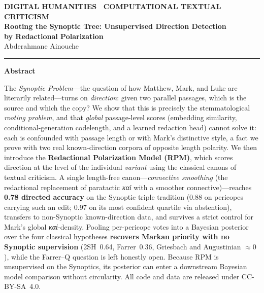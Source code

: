 \documentclass[11pt,letterpaper]{article}
\newcommand{\gk}[1]{{\greekfont\itshape #1}}
\begin{document}
\thispagestyle{firstpage}
\begin{flushleft}
{\headfont\footnotesize\bfseries\color{terracotta}\MakeUppercase{Digital Humanities \textbullet\ Computational Textual Criticism}}\\[7pt]
{\headfont\bfseries\fontsize{21}{26}\selectfont\color{marine}%
Rooting the Synoptic Tree: Unsupervised Direction Detection\\ by Redactional Polarization}\\[10pt]
{\headfont\large\color{stone} Abderahmane Ainouche}
\end{flushleft}
\vspace{6pt}
{\color{rulegrey}\rule{\linewidth}{0.9pt}}
\vspace{1.3em}

\begin{tcolorbox}[
  breakable,
  colback=papyrus, colframe=marine,
  boxrule=0pt, leftrule=2.6pt, arc=0pt, outer arc=0pt,
  left=16pt, right=16pt, top=11pt, bottom=11pt
]
{\headfont\bfseries\color{marine} Abstract}\par\vspace{5pt}
\noindent The \textit{Synoptic Problem}---the question of how Matthew, Mark, and Luke are literarily related---turns on \textit{direction}: given two parallel passages, which is the source and which the copy? We show that this is precisely the stemmatological \textit{rooting problem}, and that \textit{global} passage-level scores (embedding similarity, conditional-generation codelength, and a learned redaction head) cannot solve it: each is confounded with passage length or with Mark's distinctive style, a fact we prove with two real known-direction corpora of opposite length polarity. We then introduce the \textbf{Redactional Polarization Model (RPM)}, which scores direction at the level of the individual \textit{variant} using the classical canons of textual criticism. A single length-free canon---\textit{connective smoothing} (the redactional replacement of paratactic \gk{καί} with a smoother connective)---reaches \textbf{0.78 directed accuracy} on the Synoptic triple tradition (0.88 on pericopes carrying such an edit; 0.97 on its most confident quartile via abstention), transfers to non-Synoptic known-direction data, and survives a strict control for Mark's global \gk{καί}-density. Pooling per-pericope votes into a Bayesian posterior over the four classical hypotheses \textbf{recovers Markan priority with no Synoptic supervision} (2SH~0.64, Farrer~0.36, Griesbach and Augustinian $\approx 0$), while the Farrer--Q question is left honestly open. Because RPM is unsupervised on the Synoptics, its posterior can enter a downstream Bayesian model comparison without circularity. All code and data are released under CC-BY-SA~4.0.
\end{tcolorbox}
\end{document}
